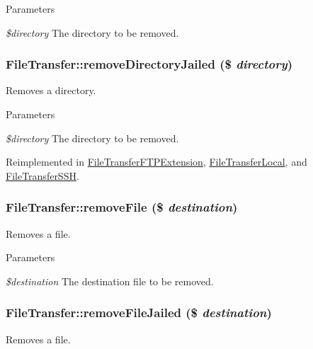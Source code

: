 \begin{DoxyParams}{Parameters}
\item[{\em \$directory}]The directory to be removed. \end{DoxyParams}
\hypertarget{classFileTransfer_a9b9a21556d191235b3a5f85c15878789}{
\subsubsection[{removeDirectoryJailed}]{\setlength{\rightskip}{0pt plus 5cm}FileTransfer::removeDirectoryJailed (\$ {\em directory})}}
\label{classFileTransfer_a9b9a21556d191235b3a5f85c15878789}
Removes a directory.


\begin{DoxyParams}{Parameters}
\item[{\em \$directory}]The directory to be removed. \end{DoxyParams}


Reimplemented in \hyperlink{classFileTransferFTPExtension_a2dc94e1f0b02a460914f8c3e8ef47d07}{FileTransferFTPExtension}, \hyperlink{classFileTransferLocal_a59e9071509cb3abc3eeb407151b2e72d}{FileTransferLocal}, and \hyperlink{classFileTransferSSH_a9b476fade233e689a0422593c961c0bb}{FileTransferSSH}.\hypertarget{classFileTransfer_a3e9fa3033b038b42c8f190da9d6915ab}{
\subsubsection[{removeFile}]{\setlength{\rightskip}{0pt plus 5cm}FileTransfer::removeFile (\$ {\em destination})}}
\label{classFileTransfer_a3e9fa3033b038b42c8f190da9d6915ab}
Removes a file.


\begin{DoxyParams}{Parameters}
\item[{\em \$destination}]The destination file to be removed. \end{DoxyParams}
\hypertarget{classFileTransfer_aa699cbea5def346f1d5ce818b0fa7ea7}{
\subsubsection[{removeFileJailed}]{\setlength{\rightskip}{0pt plus 5cm}FileTransfer::removeFileJailed (\$ {\em destination})}}
\label{classFileTransfer_aa699cbea5def346f1d5ce818b0fa7ea7}
Removes a file.


